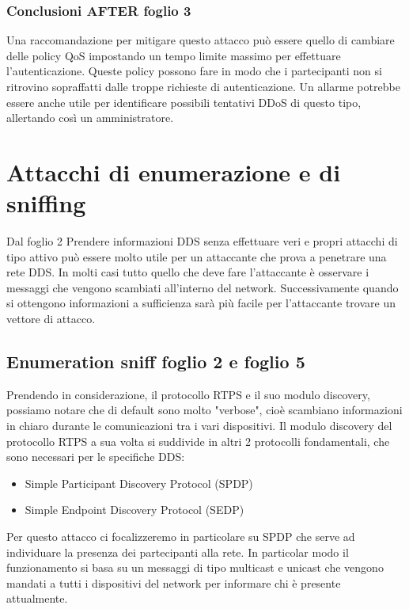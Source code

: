 \subsubsection{Conclusioni AFTER foglio 3}
Una raccomandazione per mitigare questo attacco può essere quello di cambiare delle
policy QoS impostando un tempo limite massimo per effettuare
l'autenticazione. Queste policy possono fare in modo
che i partecipanti non si ritrovino sopraffatti dalle troppe richieste di
autenticazione. Un allarme potrebbe essere anche utile per identificare possibili
tentativi DDoS di questo tipo, allertando così un amministratore.
\cite{DBLP:conf/asiaccs/WangLG24}

\section{Attacchi di enumerazione e di sniffing}
Dal foglio 2
Prendere informazioni DDS senza effettuare veri e propri
attacchi di tipo attivo può essere molto utile per un attaccante che prova
a penetrare una rete DDS. In molti casi tutto quello che deve fare l'attaccante
è osservare i messaggi che vengono scambiati all'interno del network.
Successivamente quando si ottengono informazioni a sufficienza sarà più
facile per l'attaccante trovare un vettore di attacco.\cite{White2017AnII}


\subsection{Enumeration sniff foglio 2 e foglio 5}
Prendendo in considerazione, il protocollo RTPS e il suo modulo discovery,
possiamo notare che di default sono molto "verbose", cioè scambiano 
informazioni in
chiaro durante le comunicazioni tra i vari dispositivi.\cite{White2017AnII} Il modulo 
discovery del protocollo RTPS a sua volta si suddivide in
altri 2 protocolli fondamentali, che sono necessari per le specifiche DDS:
\begin{itemize}
    \item Simple Participant Discovery Protocol (SPDP)
    \item Simple Endpoint Discovery Protocol (SEDP)
\end{itemize}
Per questo attacco ci focalizzeremo in particolare su SPDP che serve ad
individuare la presenza dei partecipanti alla rete. In particolar modo
il funzionamento si basa su un messaggi di tipo multicast e unicast che vengono
mandati a tutti i dispositivi del network per informare chi è presente attualmente.
\cite{dds1.4}


